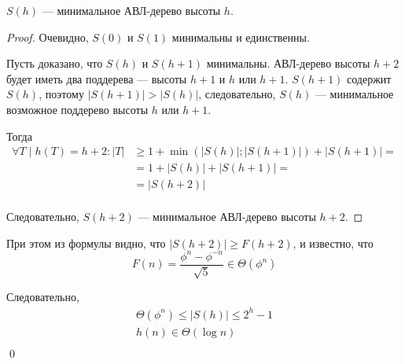 \begin{statement}
    $S(h)$ --- минимальное АВЛ-дерево высоты $h$.
\end{statement}
\begin{proof}
    Очевидно, $S(0)$ и $S(1)$ минимальны и единственны.

    Пусть доказано, что $S(h)$ и $S(h + 1)$ минимальны.
    АВЛ-дерево высоты $h + 2$ будет иметь два поддерева
    --- высоты $h + 1$ и $h$ или $h + 1$.
    $S(h + 1)$ содержит $S(h)$, поэтому
    $|S(h + 1)| > |S(h)|$, следовательно,
    $S(h)$ --- минимальное возможное поддерево высоты
    $h$ или $h + 1$.

    Тогда
    \begin{align*}
        \forall T \mid h(T) = h + 2 :
        |T| & \geq 1 + \min(|S(h)|; |S(h + 1)|) + |S(h + 1)| = \\
        & = 1 + |S(h)| + |S(h + 1)| = \\
        & = |S(h + 2)| \\
    \end{align*}

    Следовательно, $S(h + 2)$ --- минимальное
    АВЛ-дерево высоты $h + 2$.
\end{proof}

При этом из формулы видно, что
$|S(h + 2)| \geq F(h + 2)$,
и известно, что
\[
    F(n) = \frac{\phi^n - \phi^{-n}}{\sqrt{5}} \in \Theta(\phi^n)
\]

Следовательно,
\begin{gather*}
    \Theta(\phi^n) \leq |S(h)| \leq 2^h - 1 \\
    h(n) \in \Theta(\log n) \\
\end{gather*}
\qed
